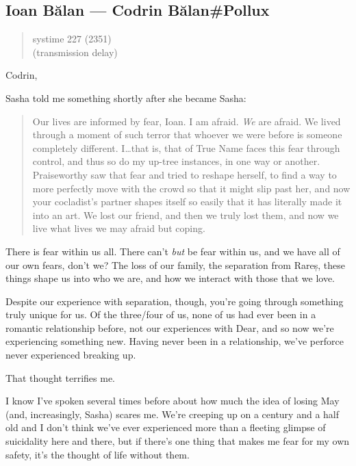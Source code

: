 \hypertarget{ioan-bux103lan-codrin-bux103lanpollux}{%
\subsection{Ioan Bălan — Codrin Bălan\#Pollux}\label{ioan-bux103lan-codrin-bux103lanpollux}}

\begin{quote}
systime 227 (2351)\\
(transmission delay)
\end{quote}

Codrin,

Sasha told me something shortly after she became Sasha:

\begin{quote}
Our lives are informed by fear, Ioan. I am afraid. \emph{We} are afraid. We lived through a moment of such terror that whoever we were before is someone completely different. I\ldots that is, that of True Name faces this fear through control, and thus so do my up-tree instances, in one way or another. Praiseworthy saw that fear and tried to reshape herself, to find a way to more perfectly move with the crowd so that it might slip past her, and now your cocladist's partner shapes itself so easily that it has literally made it into an art. We lost our friend, and then we truly lost them, and now we live what lives we may afraid but coping.
\end{quote}

There is fear within us all. There can't \emph{but} be fear within us, and we have all of our own fears, don't we? The loss of our family, the separation from Rareș, these things shape us into who we are, and how we interact with those that we love.

Despite our experience with separation, though, you're going through something truly unique for us. Of the three/four of us, none of us had ever been in a romantic relationship before, not our experiences with Dear, and so now we're experiencing something new. Having never been in a relationship, we've perforce never experienced breaking up.

That thought terrifies me.

I know I've spoken several times before about how much the idea of losing May (and, increasingly, Sasha) scares me. We're creeping up on a century and a half old and I don't think we've ever experienced more than a fleeting glimpse of suicidality here and there, but if there's one thing that makes me fear for my own safety, it's the thought of life without them.

